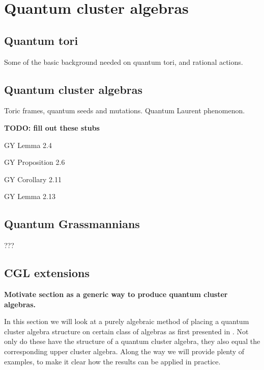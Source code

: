 \newcommand{\bbr}{\mathbf{r}}
\newcommand{\bbn}{\boldsymbol{\nu}}
\newcommand{\bbl}{\boldsymbol{\lambda}}
\newcommand{\bbg}{\boldsymbol{\gamma}}
\newcommand{\oy}{\overline{y}}
\renewcommand{\oe}{\overline{e}}

\chapter{Quantum cluster algebras}
\section{Quantum tori}

Some of the basic background needed on quantum tori, and rational actions.

\section{Quantum cluster algebras}

Toric frames, quantum seeds and mutations. Quantum Laurent phenomenon.

\textbf{TODO: fill out these stubs}

\begin{lemma}\label{lem:principal_part_skew_symmetrizable}
	GY Lemma 2.4
\end{lemma}
\begin{proposition}\label{prop:mutation_preserves_good_things}
	GY Proposition 2.6
\end{proposition}
\begin{corollary}\label{cor:formula_for_mutation}
	GY Corollary 2.11
\end{corollary}
\begin{lemma}\label{lem:equivariance_mutations}
	GY Lemma 2.13
\end{lemma}

\section{Quantum Grassmannians}
???

\section{CGL extensions}

\textbf{Motivate section as a generic way to produce quantum cluster algebras.}

In this section we will look at a purely algebraic method of placing a quantum cluster
algebra structure on certain class of algebras as first presented in
\cite{GoodearlYakimov2017QCA}. Not only do these have the structure of a quantum
cluster algebra, they also equal the corresponding upper cluster algebra. Along the way
we will provide plenty of examples, to make it clear how the results can be applied in
practice.

